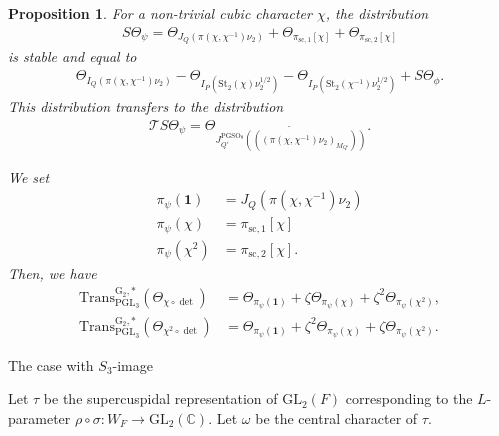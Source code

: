 \documentclass[12pt]{amsart}
\makeatletter
\renewcommand{\subsection}{\@startsection{subsection}{2}%
  \z@{.7\linespacing\@plus.5\linespacing}{.35\linespacing}%
  {\normalfont\bfseries\raggedright}}
\theoremstyle{definition}
\theoremstyle{plain}
\newtheorem{proposition}[definition]{Proposition}
\theoremstyle{remark}
\def\C{\mathbb{C}}%
\def\GL{\mathrm{GL}}
\def\PGL{\mathrm{PGL}}
\def\PGSO{\mathrm{PGSO}}
\newcommand{\cT}{\mathcal{T}}
\numberwithin{equation}{section}
\newcommand{\rG}{\mathrm{G}}
\newcommand{\Trans}{\mathrm{Trans}}
\newcommand{\St}{\mathrm{St}}
\makeatother
\begin{document}
\begin{proposition}\label{prop:subregular-cubic-ecr}
      For a non-trivial cubic character $\chi$, the distribution
      \begin{align*}
            S\Theta_{\psi} = \Theta_{J_Q(\pi(\chi, \chi^{-1}) \nu_2)} + \Theta_{\pi_{\mathrm{sc}, 1}[\chi]} + \Theta_{\pi_{\mathrm{sc}, 2}[\chi]}
      \end{align*}
      is stable and equal to
      \begin{align*}
            \Theta_{I_Q(\pi(\chi, \chi^{-1}) \nu_2)} - \Theta_{I_P(\St_2(\chi)\nu_2^{1/2})} - \Theta_{I_P(\St_2(\chi^{-1})\nu_2^{1/2})} + S\Theta_{\phi}.
      \end{align*}
      This distribution transfers to the distribution
      \begin{align*}
            \cT S\Theta_{\psi}
            =
            \Theta_{\widetilde{
                 J^{\PGSO_8}_{Q'}(((\pi(\chi, \chi^{-1})\nu_2)_{M_{Q'}}))
            }}.
      \end{align*}

      We set 
      \begin{align*}
            \pi_{\psi}(\mathbf{1}) &= J_Q(\pi(\chi, \chi^{-1}) \nu_2) \\
            \pi_{\psi}(\chi) &= \pi_{\mathrm{sc}, 1}[\chi] \\
            \pi_{\psi}(\chi^2) &= \pi_{\mathrm{sc}, 2}[\chi].
      \end{align*}
      Then, we have
      \begin{align*}
            \Trans^{\rG_2, *}_{\PGL_3}(\Theta_{\chi \circ \det}) &= \Theta_{\pi_{\psi}(\mathbf{1})} + \zeta \Theta_{\pi_{\psi}(\chi)} + \zeta^2 \Theta_{\pi_{\psi}(\chi^2)}, \\
            \Trans^{\rG_2, *}_{\PGL_3}(\Theta_{\chi^2 \circ \det}) &= \Theta_{\pi_{\psi}(\mathbf{1})} + \zeta^2 \Theta_{\pi_{\psi}(\chi)} + \zeta \Theta_{\pi_{\psi}(\chi^2)}.
      \end{align*}
\end{proposition}

\subsection{The case with $S_3$-image}\label{sec:subregular-full}

Let $\tau$ be the supercuspidal representation of $\GL_2(F)$ corresponding to the $L$-parameter $\rho \circ \sigma \colon W_F \to \GL_2(\C)$.
Let $\omega$ be the central character of $\tau$.
\end{document}
